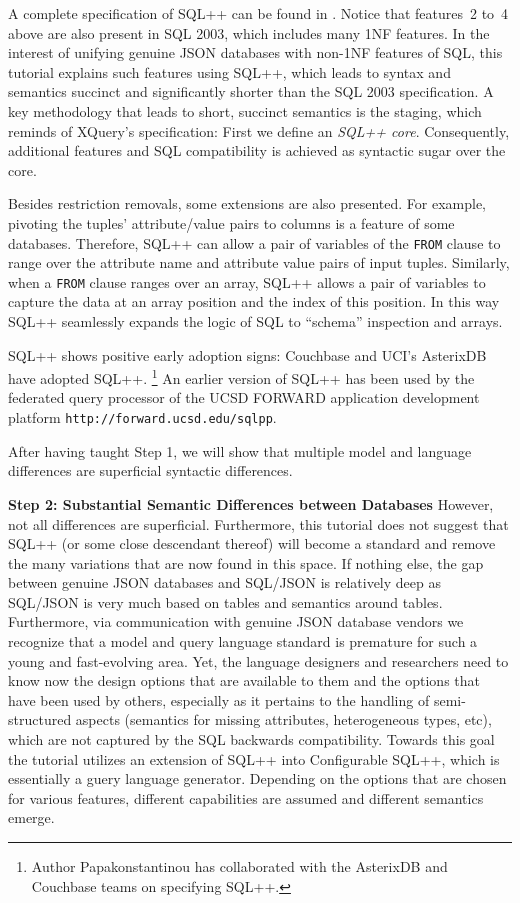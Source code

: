 A complete specification of SQL++ can be found in \cite{sqlpp-survey-2015}.
Notice that features~2 to~4 above are also present in SQL 2003, which includes many 1NF features. In the interest of unifying genuine JSON databases with non-1NF features of SQL, this tutorial explains such features using SQL++, which leads to syntax and semantics succinct and significantly shorter than the SQL 2003 specification. A key methodology that leads to short, succinct semantics is the staging, which reminds of XQuery's specification: First we define an {\em SQL++ core}. Consequently, additional features and SQL compatibility is achieved as syntactic sugar over the core. 

Besides restriction removals, some extensions are also presented. For example, pivoting the tuples' attribute/value pairs to columns is a feature of some databases. Therefore, SQL++ can allow a pair of variables of the \texttt{FROM} clause to range over the attribute name and attribute value pairs of input tuples. Similarly, when a \texttt{FROM} clause ranges over an array, SQL++ allows a pair of variables to capture the data at an array position and the index of this position. In this way SQL++ seamlessly expands the logic of SQL to ``schema'' inspection and arrays.

SQL++ shows positive early adoption signs: Couchbase and UCI's AsterixDB have  adopted SQL++.%
\footnote{Author Papakonstantinou has collaborated with the AsterixDB and Couchbase teams on specifying SQL++.}
An earlier version of SQL++ has been used by the federated query processor of the UCSD FORWARD application development platform \texttt{http://forward.ucsd.edu/sqlpp}.

After having taught Step 1, we will show that multiple model and language differences are superficial syntactic differences.

\noindent \textbf{Step 2: Substantial Semantic Differences between Databases} However, not all differences are superficial. Furthermore, this tutorial does not suggest that SQL++ (or some close descendant thereof) will become a standard and remove the many variations that are now found in this space. If nothing else, the gap between genuine JSON databases and SQL/JSON is relatively deep as SQL/JSON is very much based on tables and semantics around tables. Furthermore, via communication with genuine JSON database vendors we recognize that a model and query language standard is premature for such a young and fast-evolving area. Yet, the language designers and researchers need to know now the design options that are available to them and the options that have been used by others, especially as it pertains to the handling of semi-structured aspects (semantics for missing attributes, heterogeneous types, etc), which are not captured by the SQL backwards compatibility. 
Towards this goal the tutorial utilizes an extension of SQL++ into Configurable SQL++, which is essentially a guery language generator. Depending on the options that are chosen for various features, different capabilities are assumed and different semantics emerge.

